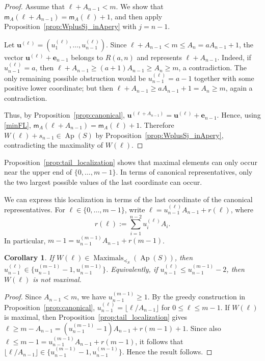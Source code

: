 \documentclass[12pt,a4paper]{amsart}
\newtheorem{corollary}[theorem]{Corollary}
\theoremstyle{definition}
\begin{document}
\begin{proof}
Assume that $\ell+A_{n-1}<m$. We show that
$\mathsf{m}_A(\ell+A_{n-1})=\mathsf{m}_A(\ell)+1$, and then apply
Proposition~\ref{prop:WplusSj_inApery} with $j=n-1$.

Let $\mathbf u^{(\ell)}=(u_1^{(\ell)},\ldots,u_{n-1}^{(\ell)})$. Since
$\ell+A_{n-1}<m\le A_n=aA_{n-1}+1$, the vector
$\mathbf u^{(\ell)}+\mathbf e_{n-1}$ belongs to $R(a,n)$ and represents
$\ell+A_{n-1}$. Indeed, if $u_{n-1}^{(\ell)}=a$, then
$\ell+A_{n-1}\ge (a+1)A_{n-1}\ge A_n\ge m$, a contradiction. The only
remaining possible obstruction would be $u_{n-1}^{(\ell)}=a-1$ together
with some positive lower coordinate; but then
$\ell+A_{n-1}\ge aA_{n-1}+1=A_n\ge m$, again a contradiction.

Thus, by Proposition~\ref{prop:canonical},
$\mathbf u^{(\ell+A_{n-1})}=\mathbf u^{(\ell)}+\mathbf e_{n-1}$. Hence,
using \eqref{minFL},
$\mathsf{m}_A(\ell+A_{n-1})=\mathsf{m}_A(\ell)+1$. Therefore
$W(\ell)+s_{n-1}\in\operatorname{Ap}(S)$ by
Proposition~\ref{prop:WplusSj_inApery}, contradicting the maximality of
$W(\ell)$.
\end{proof}

Proposition~\ref{prop:tail_localization} shows that maximal elements can only occur near the upper end of $\{0,\ldots,m-1\}$. In terms of canonical representatives, only the two largest possible values of the last coordinate can occur.

We can express this localization in terms of the last coordinate of the
canonical representatives. For $\ell\in\{0,\ldots,m-1\}$, write
$\ell=u_{n-1}^{(\ell)}A_{n-1}+r(\ell)$, where
\[r(\ell):=\sum_{i=1}^{n-2}u_i^{(\ell)}A_i.\] In particular,
$m-1=u_{n-1}^{(m-1)}A_{n-1}+r(m-1)$.

\begin{corollary}\label{cor:two_layers}
If $W(\ell) \in \operatorname{Maximals}_{\preceq_S}(\operatorname{Ap}(S))$, then
$u_{n-1}^{(\ell)}\in\{u_{n-1}^{(m-1)}-1,u_{n-1}^{(m-1)}\}$.
Equivalently, if $u_{n-1}^{(\ell)}\le u_{n-1}^{(m-1)}-2$, then
$W(\ell)$ is not maximal.
\end{corollary}

\begin{proof}
Since $A_{n-1}<m$, we have $u_{n-1}^{(m-1)}\ge 1$. By the greedy
construction in Proposition~\ref{prop:canonical},
$u_{n-1}^{(\ell)}=\lfloor \ell/A_{n-1}\rfloor$ for
$0\le \ell\le m-1$. If $W(\ell)$ is maximal, then
Proposition~\ref{prop:tail_localization} gives
$\ell\ge m-A_{n-1}=(u_{n-1}^{(m-1)}-1)A_{n-1}+r(m-1)+1$.
Since also
$\ell\le m-1=u_{n-1}^{(m-1)}A_{n-1}+r(m-1)$, it follows that
$\lfloor \ell/A_{n-1}\rfloor\in
\{u_{n-1}^{(m-1)}-1,u_{n-1}^{(m-1)}\}$. Hence the result follows.
\end{proof}
\end{document}
